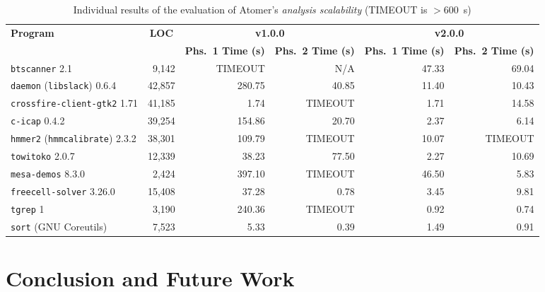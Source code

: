\documentclass{ExcelAtFIT}
\theoremstyle{example}
\begin{document}
\begin{table*}[t]
    \centering

    \begin{tabular}{|l|r|r|r|r|r|}
        \hline
        \multirow{2}{*}{\textbf{Program}} & \multicolumn{1}{c|}{\multirow{2}{*}{\textbf{LOC}}} & \multicolumn{2}{c|}{\textbf{v1.0.0}} & \multicolumn{2}{c|}{\textbf{v2.0.0}} \\ \cline{3-6}
        & & \textbf{Phs.~1 Time (s)} & \textbf{Phs.~2 Time (s)} & \textbf{Phs.~1 Time (s)} & \textbf{Phs.~2 Time (s)} \\ \hline \hline
        \texttt{btscanner} 2.1 & 9,142 & TIMEOUT & N/A & 47.33 & 69.04 \\ \hline
        \texttt{daemon} (\texttt{libslack}) 0.6.4 & 42,857 & 280.75 & 40.85 & 11.40 & 10.43 \\ \hline
        \texttt{crossfire-client-gtk2} 1.71 & 41,185 & 1.74 & TIMEOUT & 1.71 & 14.58 \\ \hline
        \texttt{c-icap} 0.4.2 & 39,254 & 154.86 & 20.70 & 2.37 & 6.14 \\ \hline
        \texttt{hmmer2} (\texttt{hmmcalibrate}) 2.3.2 & 38,301 & 109.79 & TIMEOUT & 10.07 & TIMEOUT \\ \hline
        \texttt{towitoko} 2.0.7 & 12,339 & 38.23 & 77.50 & 2.27 & 10.69 \\ \hline
        \texttt{mesa-demos} 8.3.0 & 2,424 & 397.10 & TIMEOUT & 46.50 & 5.83 \\ \hline
        \texttt{freecell-solver} 3.26.0 & 15,408 & 37.28 & 0.78 & 3.45 & 9.81 \\ \hline \hline
        \texttt{tgrep} 1 & 3,190 & 240.36 & TIMEOUT & 0.92 & 0.74 \\ \hline
        \texttt{sort} (GNU Coreutils) & 7,523 & 5.33 & 0.39 & 1.49 & 0.91 \\ \hline        
    \end{tabular}

    \caption{Individual results of the evaluation of Atomer's \emph{analysis scalability} (TIMEOUT is $ >\!600 $\ \!s)}
    \label{tab:expScal}
\end{table*}


\section{Conclusion and Future Work}
\label{sec:conc}
\end{document}
